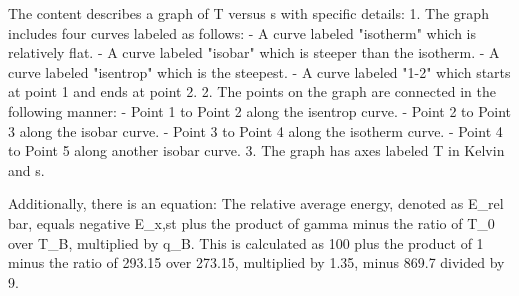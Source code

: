 The content describes a graph of T versus s with specific details:
1. The graph includes four curves labeled as follows:
   - A curve labeled "isotherm" which is relatively flat.
   - A curve labeled "isobar" which is steeper than the isotherm.
   - A curve labeled "isentrop" which is the steepest.
   - A curve labeled "1-2" which starts at point 1 and ends at point 2.
2. The points on the graph are connected in the following manner:
   - Point 1 to Point 2 along the isentrop curve.
   - Point 2 to Point 3 along the isobar curve.
   - Point 3 to Point 4 along the isotherm curve.
   - Point 4 to Point 5 along another isobar curve.
3. The graph has axes labeled T in Kelvin and s.

Additionally, there is an equation:
The relative average energy, denoted as E_rel bar, equals negative E_x,st plus the product of gamma minus the ratio of T_0 over T_B, multiplied by q_B. This is calculated as 100 plus the product of 1 minus the ratio of 293.15 over 273.15, multiplied by 1.35, minus 869.7 divided by 9.